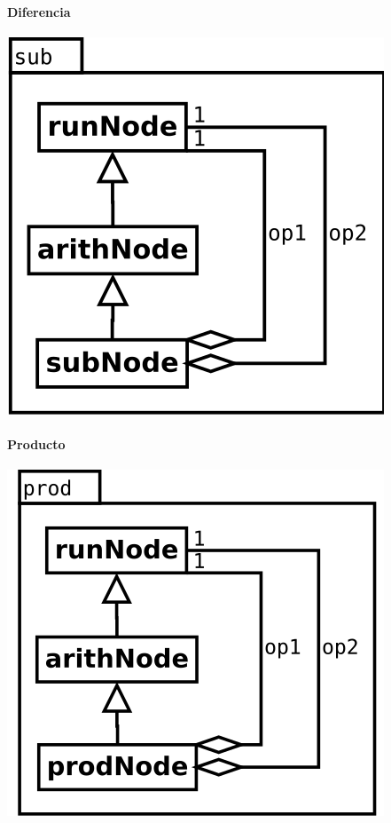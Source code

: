 \paragraph {Diferencia}
\begin{center}
\includegraphics[scale=0.4]{sub.png} \\
\end{center}

\paragraph {Producto}
\begin{center}
\includegraphics[scale=0.4]{prod.png} \\
\end{center}

